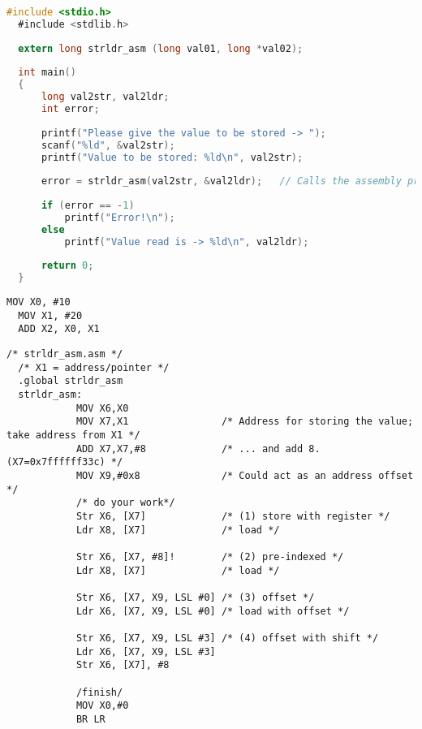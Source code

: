 \begin{lstlisting}[language=C, caption=Sample C Program with Assembly Call, label=cprogram]
  #include <stdio.h>
  #include <stdlib.h>
  
  extern long strldr_asm (long val01, long *val02);
  
  int main()
  {
      long val2str, val2ldr;
      int error;
  
      printf("Please give the value to be stored -> ");
      scanf("%ld", &val2str);
      printf("Value to be stored: %ld\n", val2str);
  
      error = strldr_asm(val2str, &val2ldr);   // Calls the assembly program
  
      if (error == -1)
          printf("Error!\n");
      else
          printf("Value read is -> %ld\n", val2ldr);
  
      return 0;
  }
\end{lstlisting}
\begin{lstlisting}[language=ARMAssembler, caption={First Assembly Code Example}, label=firstlisting]
  MOV X0, #10
  MOV X1, #20
  ADD X2, X0, X1
\end{lstlisting}


\begin{lstlisting}
/* strldr_asm.asm */
  /* X1 = address/pointer */
  .global strldr_asm
  strldr_asm:
            MOV X6,X0
            MOV X7,X1                /* Address for storing the value; take address from X1 */
            ADD X7,X7,#8             /* ... and add 8. (X7=0x7ffffff33c) */
            MOV X9,#0x8              /* Could act as an address offset */
            /* do your work*/
            Str X6, [X7]             /* (1) store with register */
            Ldr X8, [X7]             /* load */
            
            Str X6, [X7, #8]!        /* (2) pre-indexed */
            Ldr X8, [X7]             /* load */
            
            Str X6, [X7, X9, LSL #0] /* (3) offset */
            Ldr X6, [X7, X9, LSL #0] /* load with offset */
            
            Str X6, [X7, X9, LSL #3] /* (4) offset with shift */
            Ldr X6, [X7, X9, LSL #3]
            Str X6, [X7], #8 
            
            /finish/
            MOV X0,#0
            BR LR
\end{lstlisting}

